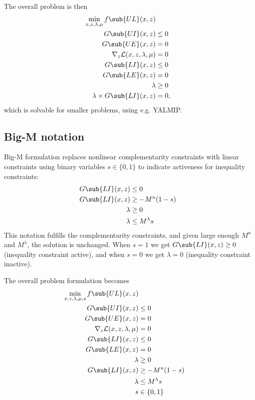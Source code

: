 The overall problem is then
\begin{equation}
\begin{split}
    \min_{x,z,\lambda,\mu} f\sub{UL}(x,z) & \\
    G\sub{UI}(x,z) & \leq 0 \\
    G\sub{UE}(x,z) &= 0 \\
    \nabla_z \mathcal{L}(x,z,\lambda,\mu) &= 0 \\
    G\sub{LI}(x,z) &\leq 0 \\
    G\sub{LE}(x,z) &= 0 \\
    \lambda &\geq 0 \\
    \lambda \times G\sub{LI}(x,z) &= 0,
\end{split}
\end{equation}
%
which is solvable for smaller problems, using e.g. YALMIP.

\subsection{Big-M notation}
Big-M formulation replaces nonlinear complementarity constraints with linear constraints using binary variables $s \in \{0,1\}$ to indicate activeness for inequality constraints:
\begin{equation}\label{eq:big-M}
\begin{split}
    G\sub{LI}(x,z) &\leq 0 \\
    G\sub{LI}(x,z) &\geq -M^u(1-s) \\
    \lambda        &\geq 0 \\
    \lambda        &\leq M^\lambda s
\end{split}
\end{equation}
This notation fulfills the complementarity constraints, and given large enough $M^u$ and $M^\lambda$, the solution is unchanged. When $s = 1$ we get $G\sub{LI}(x,z) \geq 0$ (inequality constraint active), and when $s = 0$ we get $\lambda = 0$ (inequality constraint inactive).

The overall problem formulation becomes
\begin{equation}
\begin{split}
    \min_{x,z,\lambda,\mu,s} f\sub{UL}(x,z) \\
    G\sub{UI}(x,z) & \leq 0 \\
    G\sub{UE}(x,z) &= 0 \\
    \nabla_z \mathcal{L}(x,z,\lambda,\mu) &= 0 \\
    G\sub{LI}(x,z) &\leq 0 \\
    G\sub{LE}(x,z) &= 0 \\
    \lambda &\geq 0 \\
    G\sub{LI}(x,z) &\geq -M^u(1-s) \\
    \lambda &\leq M^\lambda s \\
    s &\in \{0,1\}
\end{split}
\end{equation}

